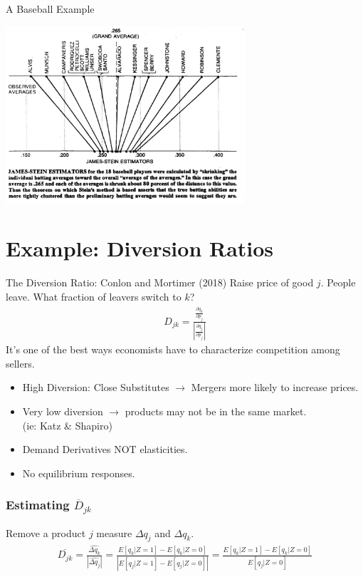 \documentclass[aspectratio=169]{beamer}
\begin{document}
\begin{frame}[fragile]{A Baseball Example}
\begin{center}
\includegraphics[width=3.5in]{./resources/baseball2.png}
\end{center}
\end{frame}
\section{Example: Diversion Ratios}
\begin{frame}{The Diversion Ratio: Conlon and Mortimer (2018)}
 Raise price of good $j$. People leave. What fraction of leavers switch to $k$?
\begin{eqnarray*}
D_{jk} = \frac{\frac{\partial q_k}{\partial p_j}}{\left|\frac{\partial q_j}{\partial p_j} \right|}
\end{eqnarray*}
It's one of the best ways economists have to characterize competition among sellers.
\begin{itemize}
\item High Diversion: Close Substitutes $\rightarrow$ Mergers more likely to increase prices.
\item Very low diversion $\rightarrow$ products may not be in the same market.\\ (ie: Katz \& Shapiro)
\item Demand Derivatives NOT elasticities.
\item No equilibrium responses.
\end{itemize}
\end{frame}

\begin{frame}
\frametitle{Estimating $\overline{D}_{jk}$}
Remove a product $j$ measure $\Delta q_j$ and $\Delta q_k$.
 \begin{eqnarray*}
 \overline{D_{jk}} =  \frac{\widehat{\Delta q_k}}{|\widehat{\Delta q_j}|} = \frac{ E[q_k | Z=1] - E[q_k | Z=0]}{ \left| E[q_j | Z=1] - E[q_j | Z=0] \right|}  
 =\frac{ E[q_k | Z=1] - E[q_k | Z=0]}{ E[q_j | Z=0] }
 \end{eqnarray*}
\end{frame}
\end{document}
